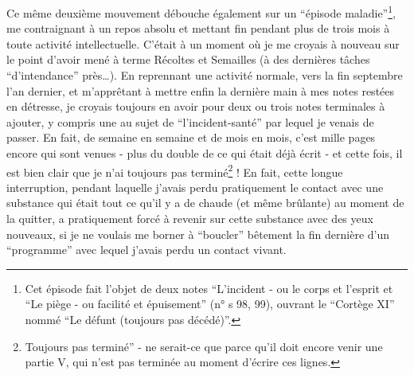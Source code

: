 Ce même deuxième mouvement débouche également sur un ``épisode maladie''\footnote{Cet épisode fait l'objet de deux notes ``L'incident - ou le corps et l'esprit et ``Le piège - ou facilité et épuisement'' (n° s 98, 99), ouvrant le ``Cortège XI'' nommé ``Le défunt (toujours pas décédé)''.}, me contraignant à un repos absolu et mettant fin pendant plus de trois mois à toute activité intellectuelle. C'était à un moment où je me croyais à nouveau sur le point d'avoir mené à terme Récoltes et Semailles (à des dernières tâches ``d'intendance'' près\ldots). En reprennant une activité normale, vers la fin septembre l'an dernier, et m'apprêtant à mettre enfin la dernière main à mes notes restées en détresse, je croyais toujours en avoir pour deux ou trois notes terminales à ajouter, y compris une au sujet de ``l'incident-santé'' par lequel je venais de passer. En fait, de semaine en semaine et de mois en mois, c'est mille pages encore qui sont venues - plus du double de ce qui était déjà écrit - et cette fois, il est bien clair que je n'ai toujours pas terminé\footnote{Toujours pas terminé'' - ne serait-ce que parce qu'il doit encore venir une partie V, qui n'est pas terminée au moment d'écrire ces lignes.} ! En fait, cette longue interruption, pendant laquelle j'avais perdu pratiquement le contact avec une substance qui était tout ce qu'il y a de chaude (et même brûlante) au moment de la quitter, a pratiquement forcé à revenir sur cette substance avec des yeux nouveaux, si je ne voulais me borner à ``boucler'' bêtement la fin dernière d'un ``programme'' avec lequel j'avais perdu un contact vivant.

